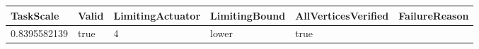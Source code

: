 \begin{tabular}{@{}llllll@{}}
\toprule
TaskScale & Valid & LimitingActuator & LimitingBound & AllVerticesVerified & FailureReason \\
\midrule
0.8395582139 & true & 4 & lower & true &  \\
\bottomrule
\end{tabular}
